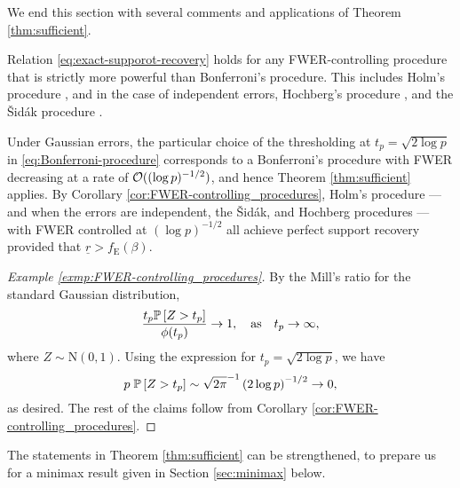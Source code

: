 \medskip
We end this section with several comments and applications of Theorem \ref{thm:sufficient}.
\begin{corollary}
\label{cor:FWER-controlling_procedures}  
Relation \eqref{eq:exact-supporot-recovery} holds for any FWER-controlling procedure that is strictly more powerful than Bonferroni's procedure. 
This includes Holm's procedure \citep*{holm1979simple}, and in the case of independent errors, Hochberg's procedure \citep*{hochberg1988sharper}, and the {\v{S}}id{\'a}k procedure \citep*{vsidak1967rectangular}.
\end{corollary}

\begin{example} \label{exmp:FWER-controlling_procedures}
Under Gaussian errors, the particular choice of the thresholding at $t_p = \sqrt{2\log{p}}$ in \eqref{eq:Bonferroni-procedure} corresponds to a Bonferroni's procedure with FWER decreasing at a rate of ${\cal O}((\log{p})^{-1/2})$, and hence Theorem \ref{thm:sufficient} applies. 
By Corollary \ref{cor:FWER-controlling_procedures}, Holm's procedure --- and when the errors are independent, the {\v{S}}id{\'a}k, and Hochberg procedures --- with FWER controlled at $(\log{p})^{-1/2}$ all achieve perfect support recovery provided that $\underline{r}>f_{\mathrm{E}}(\beta)$.

\begin{proof}[Example \ref{exmp:FWER-controlling_procedures}]
By the Mill's ratio for the standard Gaussian distribution,
$$
\frac{t_p \P\left[Z>t_p\right]}{\phi(t_p)} \to 1,\quad \text{as}\quad t_p\to\infty,
$$
where $Z\sim \text{N}(0,1)$. 
Using the expression for $t_p = \sqrt{2\log{p}}$, we have
$$
p \;\P\left[Z>t_p\right] \sim \sqrt{2\pi}^{-1}\left(2\log{p}\right)^{-1/2} \to 0,
$$
as desired. The rest of the claims follow from Corollary \ref{cor:FWER-controlling_procedures}.
\end{proof}
\end{example}


The statements in Theorem \ref{thm:sufficient} can be strengthened, to prepare us for a minimax result given in Section \ref{sec:minimax} below.

